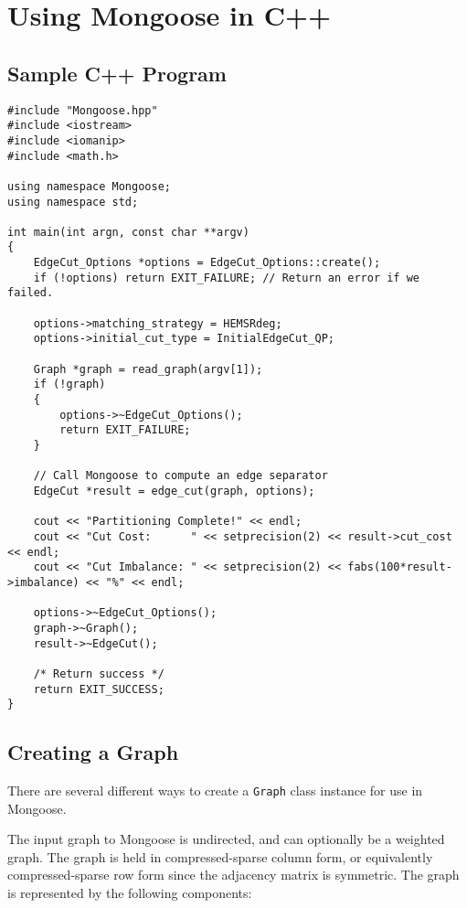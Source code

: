 \documentclass[letter]{article}
\begin{document}
\section{Using Mongoose in C++}

\subsection{Sample C++ Program}

\begin{lstlisting}
#include "Mongoose.hpp"
#include <iostream>
#include <iomanip>
#include <math.h>

using namespace Mongoose;
using namespace std;

int main(int argn, const char **argv)
{
    EdgeCut_Options *options = EdgeCut_Options::create();
    if (!options) return EXIT_FAILURE; // Return an error if we failed.

    options->matching_strategy = HEMSRdeg;
    options->initial_cut_type = InitialEdgeCut_QP;

    Graph *graph = read_graph(argv[1]);
    if (!graph)
    {
        options->~EdgeCut_Options();
        return EXIT_FAILURE;
    }

    // Call Mongoose to compute an edge separator
    EdgeCut *result = edge_cut(graph, options);

    cout << "Partitioning Complete!" << endl;
    cout << "Cut Cost:      " << setprecision(2) << result->cut_cost << endl;
    cout << "Cut Imbalance: " << setprecision(2) << fabs(100*result->imbalance) << "%" << endl;

    options->~EdgeCut_Options();
    graph->~Graph();
    result->~EdgeCut();

    /* Return success */
    return EXIT_SUCCESS;
}
\end{lstlisting}

\subsection{Creating a Graph}

There are several different ways to create a \texttt{Graph} class instance for use in Mongoose.

The input graph to Mongoose is undirected, and can optionally be a weighted
graph.  The graph is held in compressed-sparse column form, or equivalently
compressed-sparse row form since the adjacency matrix is symmetric.  The graph
is represented by the following components:
\end{document}
